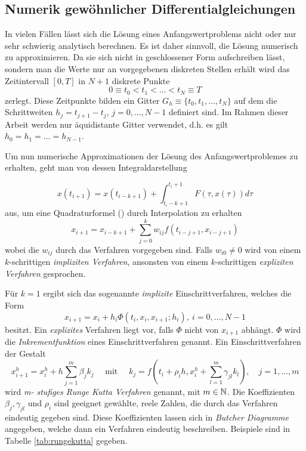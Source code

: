 

\subsection{Numerik gewöhnlicher Differentialgleichungen}
In vielen Fällen lässt sich die Lösung eines Anfangswertproblems nicht oder nur sehr schwierig analytisch berechnen. Es ist daher sinnvoll, die Lösung numerisch zu approximieren. Da sie sich nicht in geschlossener Form aufschreiben lässt, sondern man die Werte nur an vorgegebenen diskreten Stellen erhält wird das Zeitintervall $[0,T]$ in $N+1$ diskrete Punkte
\[
 0\equiv t_0<t_1<\ldots < t_N \equiv T
\]
zerlegt. Diese Zeitpunkte bilden ein Gitter $G_h \equiv \lbrace t_0,t_1,\ldots, t_N\rbrace $ auf dem die Schrittweiten $h_j= t_{j+1}-t_j$, $j=0,\ldots, N-1$ definiert sind. Im Rahmen dieser Arbeit werden nur äquidistante Gitter verwendet, d.h. es gilt $h_0=h_1 = \ldots = h_{N-1}$. 

Um nun numerische Approximationen der Lösung des Anfangswertproblemes zu erhalten, geht man von dessen Integraldarstellung 

\[
 x(t_{i+1}) = x(t_{i-k+1}) + \int_{t_i-k+1}^{t_i+1} F(\tau,x(\tau))d\tau
\]
aus, um eine Quadraturformel (\cite[(1.55)]{hermann2004numerik}) durch Interpolation zu erhalten
\[
 x_{i+1} = x_{i-k+1} + \sum_{j=0}^k w_{ij} f(t_{i-j+1},x_{i-j+1})
\]
wobei die $w_{ij}$ durch das Verfahren vorgegeben sind. Falls $w_{i0}\neq 0$ wird von einem $k$-schrittigen \textit{impliziten Verfahren}, ansonsten von einem $k$-schrittigen \textit{expliziten Verfahren} gesprochen.

Für $k=1$ ergibt sich das sogenannte \textit{implizite} Einschrittverfahren, welches die Form
\[
 x_{i+1} = x_i + h_i \Phi (t_i,x_i,x_{i+1};h_i), ~ i=0,\ldots, N-1
\]
besitzt.
Ein \textit{explizites} Verfahren liegt vor, falls $\Phi$ nicht von $x_{i+1}$ abhängt. $\Phi$ wird die \textit{Inkrementfunktion} eines Einschrittverfahren genannt.
Ein Einschrittverfahren der Gestalt 
\[
 x_{i+1}^h = x_i^h + h\sum_{j=1}^m \beta_j k_j \quad \text{ mit } \quad k_j  = f(t_i+ \rho_ih, x_i^h + \sum_{l=1}^m \gamma_{jl} k_l ), \quad j=1,\ldots,m
\]
wird \textit{m- stufiges Runge Kutta Verfahren} genannt, mit $m\in \mathbb{N}$. Die Koeffizienten $\beta_j,\gamma_{jl}$ und $\rho_i$ sind geeignet gewählte, reele Zahlen, die durch das Verfahren eindeutig gegeben sind. Diese Koeffizienten lassen sich in \textit{Butcher Diagramme} angegeben, welche dann ein Verfahren eindeutig beschreiben. Beispiele sind in Tabelle \ref{tab:rungekutta} gegeben.

